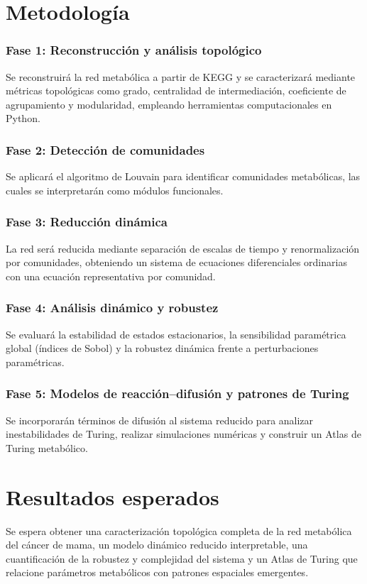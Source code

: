 \documentclass[12pt,spanish]{report}
\begin{document}
	
	\chapter{Metodología}
	\subsection{Fase 1: Reconstrucción y análisis topológico}
	
	Se reconstruirá la red metabólica a partir de KEGG y se caracterizará mediante métricas topológicas como grado, centralidad de intermediación, coeficiente de agrupamiento y modularidad, empleando herramientas computacionales en Python.
	
	\subsection{Fase 2: Detección de comunidades}
	
	Se aplicará el algoritmo de Louvain para identificar comunidades metabólicas, las cuales se interpretarán como módulos funcionales.
	
	\subsection{Fase 3: Reducción dinámica}
	
	La red será reducida mediante separación de escalas de tiempo y renormalización por comunidades, obteniendo un sistema de ecuaciones diferenciales ordinarias con una ecuación representativa por comunidad.
	
	\subsection{Fase 4: Análisis dinámico y robustez}
	
	Se evaluará la estabilidad de estados estacionarios, la sensibilidad paramétrica global (índices de Sobol) y la robustez dinámica frente a perturbaciones paramétricas.
	
	\subsection{Fase 5: Modelos de reacción--difusión y patrones de Turing}
	
	Se incorporarán términos de difusión al sistema reducido para analizar inestabilidades de Turing, realizar simulaciones numéricas y construir un Atlas de Turing metabólico.
	
	\chapter{Resultados esperados}
	Se espera obtener una caracterización topológica completa de la red metabólica del cáncer de mama, un modelo dinámico reducido interpretable, una cuantificación de la robustez y complejidad del sistema y un Atlas de Turing que relacione parámetros metabólicos con patrones espaciales emergentes.
	
\end{document}

